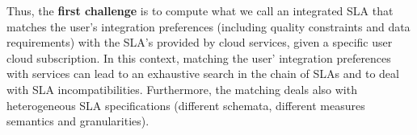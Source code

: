 \documentclass[11pt,a4paper,oneside]{report}
\begin{document}

Thus, the \textbf{first challenge} is to compute what we call an integrated SLA that matches the user's integration preferences (including quality constraints and data requirements) with the SLA's provided by cloud services, given a specific user cloud subscription. 
In this context, matching the user' integration preferences with services can lead to an exhaustive search in the chain of SLAs and to deal with SLA incompatibilities.
Furthermore, the matching deals also with heterogeneous SLA specifications (different schemata, different measures semantics and granularities).
%
\end{document}
